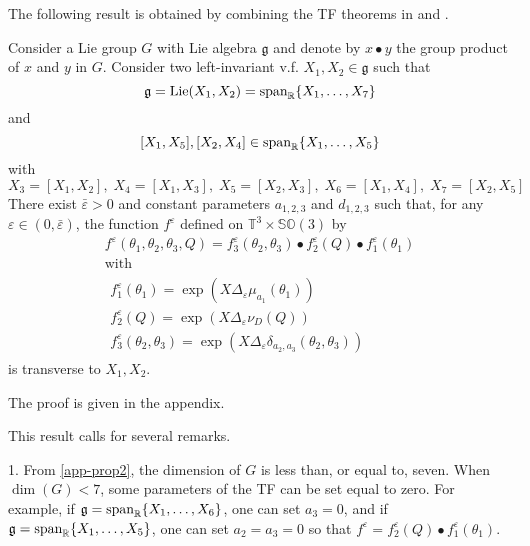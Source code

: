 \documentclass[a4paper,twoside]{article}
\def \g {{\mathfrak g}}
\def \RR {{\mathbb R}}
\def \TT {{\mathbb T}}
\def \eps {\varepsilon}
\def \span {\textnormal{span}}
\def \SO {{\mathbb S}{\mathbb O}}
\newcommand{\tnm}[1]{\textnormal{#1}}
\begin{document}
The following result is obtained by combining the  TF theorems in \cite{ms03} and \cite{ms09-cdc}.
\begin{theorem}
\label{theo2}
Consider a Lie group $G$ with Lie algebra $\g$ and denote by $x \bullet y$ the group product of $x$ and $y$ in $G$.
Consider two left-invariant v.f. $X_1, X_2 \in \g$ such that 
\begin{equation}
\label{app-prop2}
\g = \tnm{Lie}(X_1,X_2) = \span_{\RR} \{ X_1, \ldots,X_7 \} 
\end{equation}
and
\begin{equation}
\label{app-nul}
[X_1,X_5],  [X_2,X_4] \in \span_{\RR} \{ X_1, \ldots,X_5 \} 
\end{equation}
with
\begin{equation}
\label{app-lie}
X_3= [X_1,X_2], \; X_4= [X_1,X_3], \; X_5=[X_2,X_3], \; X_6= [X_1,X_4] , \; X_7= [X_2,X_5]
\end{equation}
There exist $\bar \eps>0$  and constant parameters $a_{1,2,3}$ and $d_{1,2,3}$ such that, for any 
$\eps \in (0, \bar \eps)$, the function $f^\eps$ defined on $\TT^3 \times \SO(3)$ by
\begin{equation} \label{def-tfM6}
\begin{array}{c}
f^\eps(\theta_1,\theta_2,\theta_3,Q)=  f_3^\eps(\theta_2,\theta_3) \bullet f_2^\eps(Q) \bullet f_1^\eps(\theta_1) \\
\text{with} \\
\begin{array}{l}
f_1^\eps(\theta_1)= \exp(X \Delta_\eps \mu_{a_1}(\theta_1)) \\
f_2^\eps(Q) = \exp(X \Delta_\eps  \nu_{D}(Q)) \\
f_3^\eps(\theta_2,\theta_3) = \exp(X \Delta_\eps \delta_{a_2,a_3}(\theta_2,\theta_3))
\end{array}
\end{array}
\end{equation}
is transverse to $X_1,X_2$.
\end{theorem}
\noindent The proof is given in the appendix.
\vspace*{.3cm}

\noindent This result calls for several remarks.

1. From \eqref{app-prop2}, the dimension of $G$ is less than, or equal to, seven. When $\dim(G)<7$, some parameters of the TF can
be set equal to zero. For example, if $\g= \span_{\RR} \{ X_1, \ldots,X_6 \}$, one can set $a_3=0$, and if  
$\g= \span_{\RR} \{ X_1, \ldots,X_5\}$, one can set $a_2= a_3=0$ so that $f^\eps =  f_2^\eps(Q) \bullet f_1^\eps(\theta_1)$.  
\end{document}
